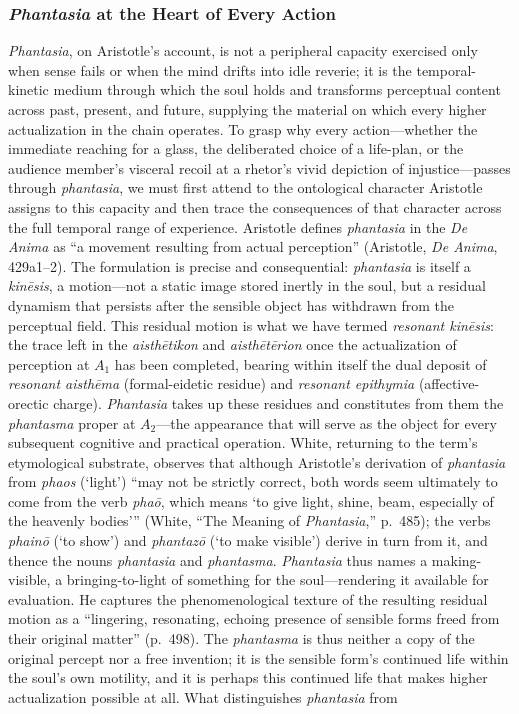 \documentclass{article}
\begin{document}

\subsubsection*{\textit{Phantasia} at the Heart of Every Action}

\textit{Phantasia}, on Aristotle's account, is not a peripheral capacity exercised only when sense fails or when the mind drifts into idle reverie; it is the temporal-kinetic medium through which the soul holds and transforms perceptual content across past, present, and future, supplying the material on which every higher actualization in the chain operates. To grasp why every action---whether the immediate reaching for a glass, the deliberated choice of a life-plan, or the audience member's visceral recoil at a rhetor's vivid depiction of injustice---passes through \textit{phantasia}, we must first attend to the ontological character Aristotle assigns to this capacity and then trace the consequences of that character across the full temporal range of experience. Aristotle defines \textit{phantasia} in the \textit{De Anima} as ``a movement resulting from actual perception'' (Aristotle, \textit{De Anima}, 429a1--2). The formulation is precise and consequential: \textit{phantasia} is itself a \textit{kin\={e}sis}, a motion---not a static image stored inertly in the soul, but a residual dynamism that persists after the sensible object has withdrawn from the perceptual field. This residual motion is what we have termed \textit{resonant kin\={e}sis}: the trace left in the \textit{aisth\={e}tikon} and \textit{aisth\={e}t\={e}rion} once the actualization of perception at $A_1$ has been completed, bearing within itself the dual deposit of \textit{resonant aisth\={e}ma} (formal-eidetic residue) and \textit{resonant epithymia} (affective-orectic charge). \textit{Phantasia} takes up these residues and constitutes from them the \textit{phantasma} proper at $A_2$---the appearance that will serve as the object for every subsequent cognitive and practical operation. White, returning to the term's etymological substrate, observes that although Aristotle's derivation of \textit{phantasia} from \textit{phaos} (`light') ``may not be strictly correct, both words seem ultimately to come from the verb \textit{phaō}, which means `to give light, shine, beam, especially of the heavenly bodies''' (White, ``The Meaning of \textit{Phantasia},'' p.~485); the verbs \textit{phainō} (`to show') and \textit{phantazō} (`to make visible') derive in turn from it, and thence the nouns \textit{phantasia} and \textit{phantasma}. \textit{Phantasia} thus names a making-visible, a bringing-to-light of something for the soul---rendering it available for evaluation. He captures the phenomenological texture of the resulting residual motion as a ``lingering, resonating, echoing presence of sensible forms freed from their original matter'' (p.~498). The \textit{phantasma} is thus neither a copy of the original percept nor a free invention; it is the sensible form's continued life within the soul's own motility, and it is perhaps this continued life that makes higher actualization possible at all. What distinguishes \textit{phantasia} from 
\end{document}
